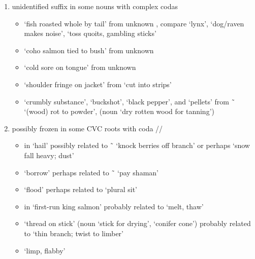 \begin{morphdesc}[resume*=alphalist]
\begin{enumerate}
	\item	unidentified suffix in some nouns with complex codas
		\begin{itemize}
		\item	{} ‘fish roasted whole by tail’
			from unknown ,
			compare  ‘lynx’,
			 ‘dog/raven makes noise’,
			 ‘toss quoits, gambling sticks’
		\item	{} ‘coho salmon tied to bush’
			from unknown 
		\item	{} ‘cold sore on tongue’
			from unknown 
		\item	{} ‘shoulder fringe on jacket’
			from  ‘cut into strips’
		\item	{} ‘crumbly substance’,
			 ‘buckshot’,
			 ‘black pepper’,
			and  ‘pellets’
			from  \~\  ‘(wood) rot to powder’,
			(noun  ‘dry rotten wood for tanning’)
		\end{itemize}
	\item	possibly frozen in some CVC roots with coda //
		\begin{itemize}
		\item	{} in  ‘hail’
			possibly related to  \~\  ‘knock berries off branch’
			or perhaps  ‘snow fall heavy; dust’
		\item	{} ‘borrow’
			perhaps related to  \~\  ‘pay shaman’
		\item	{} ‘flood’
			perhaps related to  ‘plural sit’
		\item	{} in  ‘first-run king salmon’
			probably related to  ‘melt, thaw’
		\item	{} ‘thread on stick’
			(noun  ‘stick for drying’,  ‘conifer cone’)
			probably related to  ‘thin branch; twist to limber’
		\item	{} ‘limp, flabby’

\end{itemize}
\end{enumerate}
\end{morphdesc}
